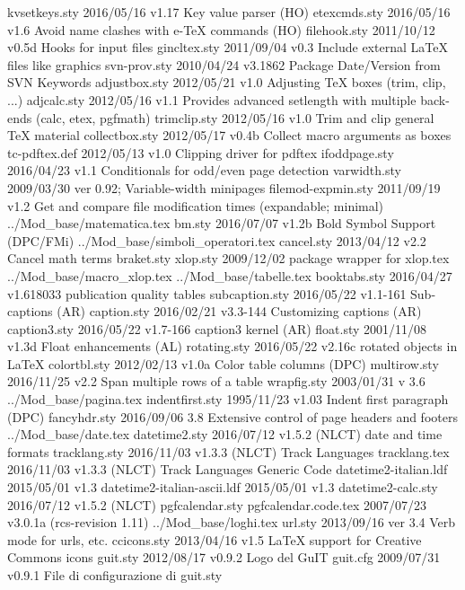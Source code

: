 kvsetkeys.sty    2016/05/16 v1.17 Key value parser (HO)
etexcmds.sty    2016/05/16 v1.6 Avoid name clashes with e-TeX commands (HO)
filehook.sty    2011/10/12 v0.5d Hooks for input files
gincltex.sty    2011/09/04 v0.3 Include external LaTeX files like graphics
svn-prov.sty    2010/04/24 v3.1862 Package Date/Version from SVN Keywords
adjustbox.sty    2012/05/21 v1.0 Adjusting TeX boxes (trim, clip, ...)
 adjcalc.sty    2012/05/16 v1.1 Provides advanced setlength with multiple back-ends (calc, etex, pgfmath)
trimclip.sty    2012/05/16 v1.0 Trim and clip general TeX material
collectbox.sty    2012/05/17 v0.4b Collect macro arguments as boxes
tc-pdftex.def    2012/05/13 v1.0 Clipping driver for pdftex
ifoddpage.sty    2016/04/23 v1.1 Conditionals for odd/even page detection
varwidth.sty    2009/03/30 ver 0.92;  Variable-width minipages
filemod-expmin.sty    2011/09/19 v1.2 Get and compare file modification times (expandable; minimal)
../Mod_base/matematica.tex
      bm.sty    2016/07/07 v1.2b Bold Symbol Support (DPC/FMi)
../Mod_base/simboli_operatori.tex
  cancel.sty    2013/04/12 v2.2 Cancel math terms
  braket.sty    
    xlop.sty    2009/12/02 package wrapper for xlop.tex
../Mod_base/macro_xlop.tex
../Mod_base/tabelle.tex
booktabs.sty    2016/04/27 v1.618033 publication quality tables
subcaption.sty    2016/05/22 v1.1-161 Sub-captions (AR)
 caption.sty    2016/02/21 v3.3-144 Customizing captions (AR)
caption3.sty    2016/05/22 v1.7-166 caption3 kernel (AR)
   float.sty    2001/11/08 v1.3d Float enhancements (AL)
rotating.sty    2016/05/22 v2.16c rotated objects in LaTeX
colortbl.sty    2012/02/13 v1.0a Color table columns (DPC)
multirow.sty    2016/11/25 v2.2 Span multiple rows of a table
 wrapfig.sty    2003/01/31  v 3.6
../Mod_base/pagina.tex
indentfirst.sty    1995/11/23 v1.03 Indent first paragraph (DPC)
fancyhdr.sty    2016/09/06 3.8 Extensive control of page headers and footers
../Mod_base/date.tex
datetime2.sty    2016/07/12 v1.5.2 (NLCT) date and time formats
tracklang.sty    2016/11/03 v1.3.3 (NLCT) Track Languages
tracklang.tex    2016/11/03 v1.3.3 (NLCT) Track Languages Generic Code
datetime2-italian.ldf    2015/05/01 v1.3
datetime2-italian-ascii.ldf    2015/05/01 v1.3
datetime2-calc.sty    2016/07/12 v1.5.2 (NLCT)
pgfcalendar.sty    
pgfcalendar.code.tex    2007/07/23 v3.0.1a (rcs-revision 1.11)
../Mod_base/loghi.tex
     url.sty    2013/09/16  ver 3.4  Verb mode for urls, etc.
 ccicons.sty    2013/04/16 v1.5 LaTeX support for Creative Commons icons
    guit.sty    2012/08/17 v0.9.2 Logo del GuIT
    guit.cfg    2009/07/31 v0.9.1 File di configurazione di guit.sty
